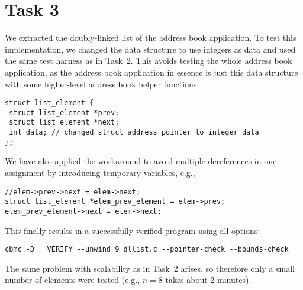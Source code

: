 \section*{Task 3}
We extracted the doubly-linked list of the address book application. To test this implementation, we changed the data structure to use integers as data and used the same test harness as in Task~2. This avoids testing the whole address book application, as the address book application in essence is just this data structure with some higher-level address book helper functions.

\begin{lstlisting}
struct list_element {
 struct list_element *prev;
 struct list_element *next;
 int data; // changed struct address pointer to integer data
};
\end{lstlisting}

We have also applied the workaround to avoid multiple dereferences in one assignment by introducing temporary variables, e.g., 
\begin{lstlisting}
//elem->prev->next = elem->next;
struct list_element *elem_prev_element = elem->prev;
elem_prev_element->next = elem->next;
\end{lstlisting}

This finally results in a successfully verified program using all options: 
\begin{Verbatim}[formatcom=\color{red}]
cbmc -D __VERIFY --unwind 9 dllist.c --pointer-check --bounds-check
\end{Verbatim} 
The same problem with scalability as in Task~2 arises, so therefore only a small number of elements were tested (e.g., $n=8$ takes about 2 minutes).

